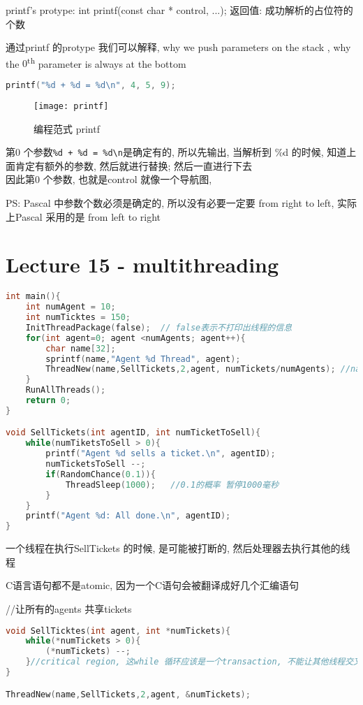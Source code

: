 \documentclass{article}
\begin{document}
printf's protype: int printf(const char * control, ...); 返回值: 成功解析的占位符的个数

通过printf 的protype 我们可以解释, why we push parameters on the stack , why the $0$\textsuperscript{th} parameter is always at the bottom

\begin{lstlisting}[language = C]
printf("%d + %d = %d\n", 4, 5, 9);
\end{lstlisting}
\begin{figure}[htbp]
	\centering
	\texttt{[image: printf]}\\
	\caption{编程范式 printf}\label{fig.printf}
\end{figure}

第0 个参数\verb "%d + %
因此第0 个参数, 也就是control 就像一个导航图,

PS: Pascal 中参数个数必须是确定的, 所以没有必要一定要 from right to left, 实际上Pascal 采用的是 from left to right

\section{Lecture 15 - multithreading}
\begin{lstlisting}[language = C]
int main(){
	int numAgent = 10;
	int numTicktes = 150;
	InitThreadPackage(false);  // false表示不打印出线程的信息
	for(int agent=0; agent <numAgents; agent++){
		char name[32];
		sprintf(name,"Agent %d Thread", agent);
		ThreadNew(name,SellTickets,2,agent, numTickets/numAgents); //name标记不同的线程
	}
	RunAllThreads();
	return 0;
}

void SellTickets(int agentID, int numTicketToSell){
	while(numTiketsToSell > 0){
		printf("Agent %d sells a ticket.\n", agentID);
		numTicketsToSell --;
		if(RandomChance(0.1)){
			ThreadSleep(1000);	 //0.1的概率 暂停1000毫秒
		}
	}
	printf("Agent %d: All done.\n", agentID);
}
\end{lstlisting}
一个线程在执行SellTickets 的时候, 是可能被打断的, 然后处理器去执行其他的线程

C语言语句都不是atomic, 因为一个C语句会被翻译成好几个汇编语句

//让所有的agents 共享tickets
\begin{lstlisting}[language = C]
void SellTicktes(int agent, int *numTickets){
	while(*numTickets > 0){
		(*numTickets) --;
	}//critical region, 这while 循环应该是一个transaction, 不能让其他线程交叉进来
}

ThreadNew(name,SellTickets,2,agent, &numTickets);
\end{lstlisting}
\end{document}
